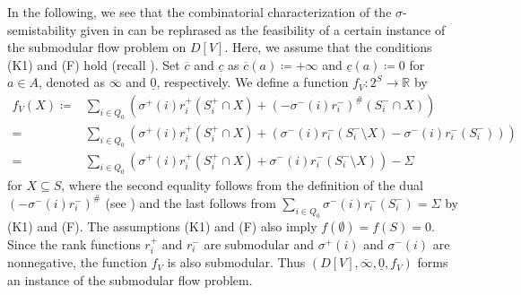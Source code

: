 \documentclass[a4paper,11pt]{article}
\numberwithin{equation}{section}
\newcommand{\R}{\mathbb{R}}
\begin{document}
In the following, we see that the combinatorial characterization of the $\sigma$-semistability given in  can be rephrased as the feasibility of a certain instance of the submodular flow problem on $D[V]$.
Here, we assume that the conditions (K1)
and (F) hold (recall ).
Set $\overline{c}$ and $\underline{c}$ as $\overline{c}(a) \coloneqq +\infty$ and $\underline{c}(a) \coloneqq 0$ for $a \in A$,
denoted as $\overline{\infty}$ and $\underline{0}$, respectively.
We define a function $f_V : 2^S \to \R$ by
\begin{align}
    f_V(X) \coloneqq& \sum_{i \in Q_0} \left(\sigma^+(i) r_i^+(S_i^+ \cap X) +  (-\sigma^-(i) r_i^-)^\# (S_i^- \cap X) \right)\\
    {}=& \sum_{i \in Q_0} \left(\sigma^+(i) r_i^+(S_i^+ \cap X) +  \left(\sigma^-(i) r_i^-(S_i^- \setminus X) - \sigma^-(i)r_i^-(S_i^-)\right) \right)\\
    {}=& \sum_{i \in Q_0} \left(\sigma^+(i) r_i^+(S_i^+ \cap X) +  \sigma^-(i) r_i^-(S_i^- \setminus X) \right) - \Sigma \label{eq:f_V}
\end{align}
for $X \subseteq S$,
where the second equality follows from the definition of the dual $(-\sigma^-(i) r_i^-)^\#$ (see )
and the last follows from $\sum_{i \in Q_0} \sigma^-(i) r_i^-(S_i^-) = \Sigma$ by (K1) and (F).
The assumptions (K1) and (F) also imply $f(\emptyset) = f(S) = 0$.
Since the rank functions $r_i^+$ and $r_i^-$ are submodular and $\sigma^+(i)$ and $\sigma^-(i)$ are nonnegative,
the function $f_V$ is also submodular.
Thus $(D[V], \overline{\infty}, \underline{0}, f_V)$ forms an instance of the submodular flow problem.
\end{document}
